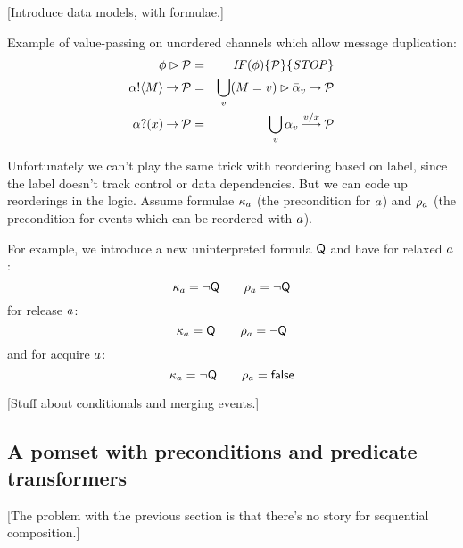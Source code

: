 [Introduce data models, with formulae.]

Example of value-passing on unordered channels which allow
message duplication:
\begin{eqnarray*}
  \aForm\sGUARD\aPSS & = &
  \sIF{\aForm}\sTHEN\aPSS\sELSE\sSTOP\sFI
\\
  \sSEND\aChan\aExp\wPREFIX\aPSS & = &
  \bigcup_\aVal (\aExp=\aVal) \sGUARD \send\aChan{\aVal} \wPREFIX \aPSS
\\
  \sRECV\aChan\aVar\wPREFIX\aPSS & = &
  \bigcup_\aVal \recv\aChan{\aVal} \wPREFIX[\aVal/\aVar] \aPSS
\end{eqnarray*}

Unfortunately we can't play the same trick with reordering based on
label, since the label doesn't track control or data dependencies. But
we can code up reorderings in the logic. Assume formulae
$\kappa_a$ (the precondition for $a$) and
$\rho_a$ (the precondition for events which can be reordered with $a$).

For example, we introduce a new uninterpreted formula $\mathsf{Q}$
and have for relaxed $a$:
\[
  \kappa_{a} = \neg\mathsf{Q}
\qquad
  \rho_{a} = \neg\mathsf{Q}
\]
for release $a$:
\[
  \kappa_{a} = \mathsf{Q}
\qquad
  \rho_{a} = \neg\mathsf{Q}
\]
and for acquire $a$:
\[
  \kappa_{a} = \neg\mathsf{Q}
\qquad
  \rho_{a} = \mathsf{false}
\]

[Stuff about conditionals and merging events.]

\subsection{A pomset with preconditions and predicate transformers}

[The problem with the previous section is that there's no story for sequential composition.]

